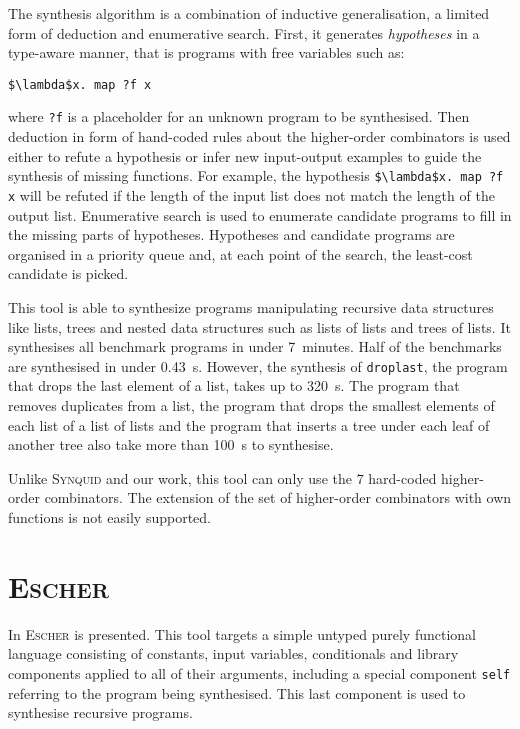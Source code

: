 The synthesis algorithm is a combination of inductive generalisation, a limited form of deduction and enumerative search.
First, it generates \emph{hypotheses} in a type-aware manner, that is programs with free variables such as:
\begin{lstlisting}[style=plain]
$\lambda$x. map ?f x
\end{lstlisting}
where \lstinline!?f! is a placeholder for an unknown program to be synthesised.
Then deduction in form of hand-coded rules about the higher-order combinators is used either to refute a hypothesis or infer new input-output examples to guide the synthesis of missing functions. For example, the hypothesis \lstinline!$\lambda$x. map ?f x! will be refuted if the length of the input list does not match the length of the output list.
Enumerative search is used to enumerate candidate programs to fill in the missing parts of hypotheses. Hypotheses and candidate programs are organised in a priority queue and, at each point of the search, the least-cost candidate is picked.

This tool is able to synthesize programs manipulating recursive data structures like lists, trees and nested data structures such as lists of lists and trees of lists.
It synthesises all benchmark programs in under 7~minutes. Half of the benchmarks are synthesised in under \SI{0.43}{s}. However, the synthesis of \lstinline!droplast!, the program that drops the last element of a list, takes up to \SI{320}{s}. The program that removes duplicates from a list, the program that drops the smallest elements of each list of a list of lists and the program that inserts a tree under each leaf of another tree also take more than \SI{100}{s} to synthesise.

Unlike \textsc{Synquid} and our work, this tool can only use the $7$ hard-coded higher-order combinators. The extension of the set of higher-order combinators with own functions is not easily supported.


\section{\mdseries\textsc{Escher}}

In \cite{EscherPaper} \textsc{Escher} is presented. This tool targets a simple untyped purely functional language consisting of constants, input variables, conditionals and library components applied to all of their arguments, including a special component \lstinline!self! referring to the program being synthesised. This last component is used to synthesise recursive programs.

